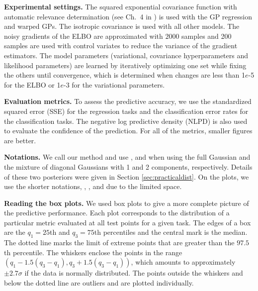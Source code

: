 \par
\textbf{Experimental settings.}
The squared exponential covariance function with 
automatic relevance determination (see Ch.~4 in \cite{rasmussen-williams-book}) is used with the 
GP regression and warped GPs.
The isotropic covariance %
is used with all other models.
The noisy gradients of the ELBO are approximated with $2000$ samples and  200 samples are used with control variates to reduce the variance of the gradient estimators.
The model parameters (variational, covariance hyperparameters and likelihood parameters) 
are learned by iteratively optimizing one set while fixing the others until convergence, which is determined 
when changes are less than 1$e$-5 for the ELBO or 1$e$-3 for the variational parameters.
%
\par
\textbf{Evaluation metrics.}
To assess the predictive accuracy, we use the standardized squared error (SSE) for the regression tasks and the classification error rates for the classification tasks.
The negative log predictive density (NLPD) is also used to evaluate the confidence of the prediction.
For all of the metrics, smaller figures are better.
%
\par
\textbf{Notations.}
We call our method \agp \space and use \agpfull, \agpmix \space and \agpmixtwo \space
when using the full Gaussian and the mixture of diagonal Gaussians with 1 and 2 components, respectively. 
Details of these two posteriors were given in Section \ref{sec:practicaldist}.
On the plots, we use the shorter notations, \full, \mix, and \mixtwo \space due to the limited space.
%
\par
\textbf{Reading the box plots.}
We used box plots to give a more complete picture of the predictive performance.
Each plot corresponds to the distribution of a particular metric evaluated at all  test points for a given task.
The edges of a box are the $q_1 = 25$th and $q_3 = 75$th percentiles and the central mark is the median. 
The dotted line marks the limit of extreme points that are greater than the $97.5$th percentile. 
The whiskers enclose the points in the range $(q_1 - 1.5(q_3 - q_1), q_3 + 1.5(q_3 - q_1))$, which amounts to approximately $\pm 2.7\sigma$ if the data is normally distributed. 
The points outside the whiskers and below the dotted line are outliers and are plotted individually.

